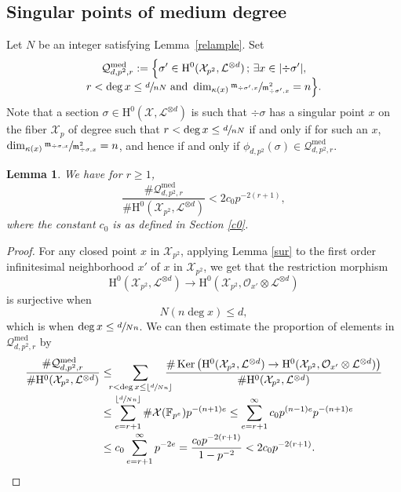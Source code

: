 \documentclass[JEP,XML,SOM,Unicode,published]{cedram}
\newcommand{\sep}{\,;\,}
\theoremstyle{plain}
\newtheorem{lem}[thm]{Lemma}
\theoremstyle{definition}
\newcommand{\ho}{\mathrm{H}}
\newcommand{\Oc}{\mathcal{O}}
\newcommand{\m}{\mathfrak{m}}
\newcommand{\X}{\mathcal{X}}
\newcommand{\li}{\mathcal{L}}
\newcommand{\F}{\mathbb{F}}
\DeclareMathOperator{\Ker}{Ker}
\begin{document}
\subsection{Singular points of medium degree}\label{step2}

Let $N$ be an integer satisfying Lem\-ma~\ref{relample}. Set\vspace*{-3pt}
\begin{multline*}
\mathcal{Q}^{\mathrm{med}}_{d,p^2,r}:=\Bigl\{ \sigma'\in \ho^0(\X_{p^2}, \li^{\otimes d})\sep \exists x\in |{\div\sigma'}|,\\[-5pt]
r<\deg x\leq \sfrac{d}{nN} \text{ and } \dim_{\kappa(x)}\sfrac{\m_{\div \sigma',x}}{\m^2_{\div \sigma', x}}=n \Bigr\}.
\end{multline*}
Note that a section $\sigma\in \ho^0(\X, \li^{\otimes d})$ is such that $\div \sigma$ has a singular point $x$ on the fiber $\X_p$ of degree such that $r<\deg x\leq \sfrac{d}{nN}$ if and only if for such an $x$, $\dim_{\kappa(x)}\sfrac{\m_{\div \sigma,x}}{\m^2_{\div \sigma, x}}=n$, and hence if and only if $\phi_{d,p^2}(\sigma)\in \mathcal{Q}^{\mathrm{med}}_{d,p^2,r}$.

\begin{lem}\label{medi}
We have for $r\geq 1$,\vspace*{-3pt}
\[
\frac{\#\mathcal{Q}^{\mathrm{med}}_{d,p^2,r}}{\#\ho^0(\X_{p^2}, \li^{\otimes d})}<2c_0p^{-2(r+1)},
\]
where the constant $c_0$ is as defined in Section \ref{c0}.
\end{lem}
\begin{proof}
For any closed point $x$ in $\X_{p^2}$, applying Lemma \ref{sur} to the first order infinitesimal neighborhood $x'$ of $x$ in $\X_{p^2}$, we get that the restriction morphism\vspace*{-2pt}
\[
\ho^0(\X_{p^2}, \li^{\otimes d})\to \ho^0(\X_{p^2}, \Oc_{x'}\otimes \li^{\otimes d})
\]
is surjective when\vspace*{-3pt}
\[
N(n\deg x)\leq d,
\]
which is when $\deg x\leq \sfrac{d}{Nn}$.
We can then estimate the proportion of elements in $\mathcal{Q}^{\mathrm{med}}_{d,p^2,r}$ by\vspace*{-3pt}
\begin{align*}
\frac{\#\mathcal{Q}^{\mathrm{med}}_{d,p^2,r}}{\#\ho^0(\X_{p^2}, \li^{\otimes d})}&\leq \hspace*{-2mm}\sum_{r<\deg x\leq \lfloor\sfrac{d}{Nn}\rfloor} \hspace*{-3mm}\frac{\#\Ker\left(\ho^0(\X_{p^2}, \li^{\otimes d})\to \ho^0(\X_{p^2}, \Oc_{x'}\otimes \li^{\otimes d}) \right) }{\#\ho^0(\X_{p^2}, \li^{\otimes d})}\\[-2pt]
&\leq \sum_{e=r+1}^{\lfloor\sfrac{d}{Nn}\rfloor}\#\X(\F_{p^e}) p^{-(n+1)e}\leq \sum_{e=r+1}^{\infty}c_0p^{(n-1)e} p^{-(n+1)e} \\[-2pt]
&\leq c_0 \sum_{e=r+1}^{\infty}p^{-2e}=\frac{c_0p^{-2(r+1)}}{1-p^{-2}}<2c_0p^{-2(r+1)}.\qedhere
\end{align*}
\end{proof}
\end{document}
